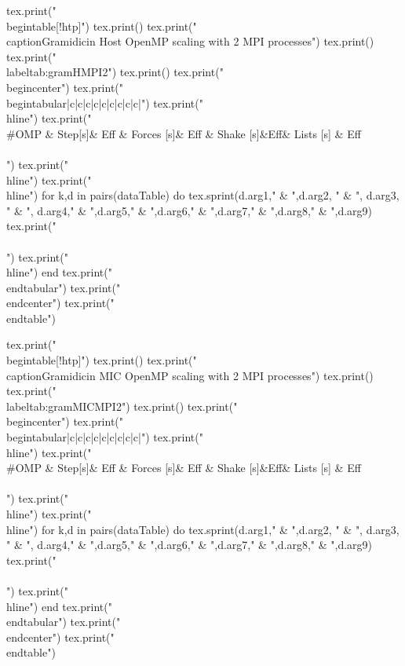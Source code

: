 \begin{luacode*}
  tex.print("\\begin{table}[!htp]")
  tex.print()
  tex.print("\\caption{Gramidicin Host OpenMP scaling with 2 MPI processes}")
  tex.print()
  tex.print("\\label{tab:gramHMPI2}")
  tex.print()
  tex.print("\\begin{center}")
  tex.print("\\begin{tabular}{|c|c|c|c|c|c|c|c|c|}")
  tex.print("\\hline")
  tex.print("\\#OMP & Step[s]& Eff & Forces [s]& Eff & Shake [s]&Eff& Lists [s] & Eff\\\\")
  tex.print("\\hline")
  tex.print("\\hline")
  for k,d in pairs(dataTable) do
    tex.sprint(d.arg1," & ",d.arg2, " & ", d.arg3, " & ", d.arg4," & ",d.arg5," & ",d.arg6," & ",d.arg7," & ",d.arg8," & ",d.arg9)
    tex.print(" \\\\")
    tex.print("\\hline")
  end
  tex.print("\\end{tabular}")
  tex.print("\\end{center}")
  tex.print("\\end{table}")
\end{luacode*}
\begin{luacode*}
  tex.print("\\begin{table}[!htp]")
  tex.print()
  tex.print("\\caption{Gramidicin MIC OpenMP scaling with 2 MPI processes}")
  tex.print()
  tex.print("\\label{tab:gramMICMPI2}")
  tex.print()
  tex.print("\\begin{center}")
  tex.print("\\begin{tabular}{|c|c|c|c|c|c|c|c|c|}")
  tex.print("\\hline")
  tex.print("\\#OMP & Step[s]& Eff & Forces [s]& Eff & Shake [s]&Eff& Lists [s] & Eff\\\\")
  tex.print("\\hline")
  tex.print("\\hline")
  for k,d in pairs(dataTable) do
    tex.sprint(d.arg1," & ",d.arg2, " & ", d.arg3, " & ", d.arg4," & ",d.arg5," & ",d.arg6," & ",d.arg7," & ",d.arg8," & ",d.arg9)
    tex.print(" \\\\")
    tex.print("\\hline")
  end
  tex.print("\\end{tabular}")
  tex.print("\\end{center}")
  tex.print("\\end{table}")
\end{luacode*}
